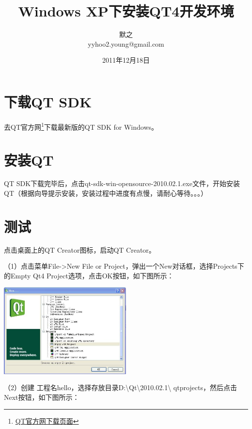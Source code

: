 \documentclass[a4paper, 12pt]{article}
\begin{document}
\setlength{\parindent}{2em}                    

\title{Windows XP下安装QT4开发环境}
\author{默之\\\textrm{yyhoo2.young@gmail.com}}
\date{2011年12月18日}
\maketitle

\section{下载QT SDK}
去QT官方网\footnote{\href{http://qt.nokia.com/downloads}{QT官方网下载页面}}下载最新版的QT SDK for Windows。

\section{安装QT}

QT SDK下载完毕后，点击qt-sdk-win-opensource-2010.02.1.exe文件，开始安装QT（根据向导提示安装，安装过程中进度有点慢，请耐心等待。。。）

\section{测试}
点击桌面上的QT Creator图标，启动QT Creator。

（1）点击菜单File->New File or Project，弹出一个New对话框，选择Projects下的Empty Qt4 Project选项，点击OK按钮，如下图所示：

\begin{center}
  \setlength{\abovecaptionskip}{0pt}    
  \setlength{\belowcaptionskip}{10pt}
  \includegraphics[width=0.5\textwidth]{pics/qt01.jpg}
\end{center}


（2）创建 工程名hello，选择存放目录D:\textbackslash Qt\textbackslash 2010.02.1\textbackslash
qtprojects，然后点击Next按钮，如下图所示：
\end{document}
